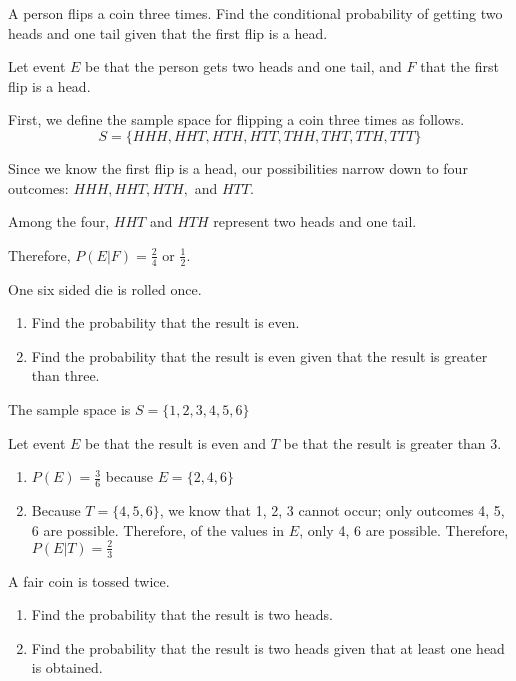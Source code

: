 \begin{example} A person flips a coin three times. Find the conditional probability of getting two heads and one tail given that the first flip is a head.
\end{example}
\begin{solution}
    Let event \( E \) be that the person gets two heads and one tail, and \( F \) that the first flip is a head.

    First, we define the sample space for flipping a coin three times as follows.
    \[ S = \{HHH, HHT, HTH, HTT, THH, THT, TTH, TTT\} \]

    Since we know the first flip is a head, our possibilities narrow down to four outcomes: \( HHH, HHT, HTH, \) and \( HTT \).

    Among the four, \( HHT \) and \( HTH \) represent two heads and one tail.

    Therefore, \( P(E | F) = \frac{2}{4} \) or \( \frac{1}{2} \).
\end{solution}

\begin{example}
    One six sided die is rolled once.
    \begin{enumerate}
        \item Find the probability that the result is even.
        \item Find the probability that the result is even given that the result is greater than three.
    \end{enumerate}
\end{example}

\begin{solution}
    The sample space is \( S = \{1,2,3,4,5,6\} \)

    Let event \( E \) be that the result is even and \( T \) be that the result is greater than 3.
    \begin{enumerate}
        \item \( P(E) = \frac{3}{6} \) because \( E = \{2,4,6\} \)
        \item Because \( T = \{4,5,6\} \), we know that 1, 2, 3 cannot occur; only outcomes 4, 5, 6 are possible. Therefore, of the values in \( E \), only 4, 6 are possible. Therefore, \( P(E|T) = \frac{2}{3} \)
    \end{enumerate}
\end{solution}

\begin{example}
    A fair coin is tossed twice.
    \begin{enumerate}
        \item Find the probability that the result is two heads.
        \item Find the probability that the result is two heads given that at least one head is obtained.
    \end{enumerate}
\end{example}

